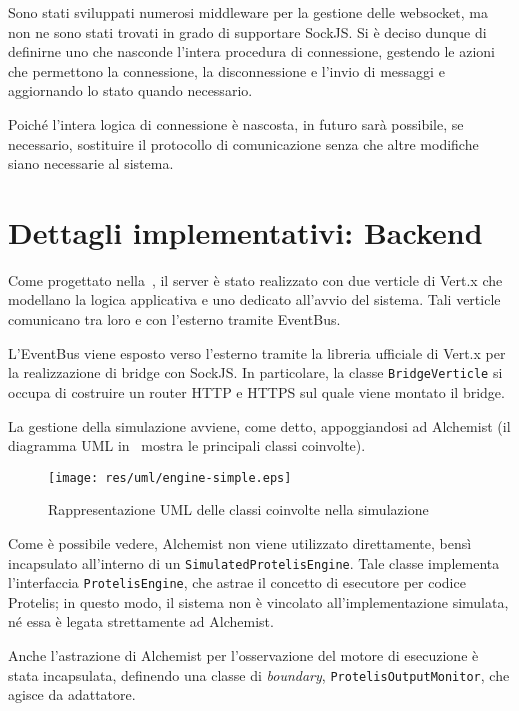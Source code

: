     Sono stati sviluppati numerosi middleware per la gestione delle websocket, ma non ne sono stati trovati in grado di supportare SockJS\@.
    Si è deciso dunque di definirne uno che nasconde l'intera procedura di connessione, gestendo le azioni che permettono la connessione, la disconnessione e l'invio di messaggi e aggiornando lo stato quando necessario.

    Poiché l'intera logica di connessione è nascosta, in futuro sarà possibile, se necessario, sostituire il protocollo di comunicazione senza che altre modifiche siano necessarie al sistema.


  \section{Dettagli implementativi: Backend}

    Come progettato nella~, il server è stato realizzato con due verticle di Vert.x che modellano la logica applicativa e uno dedicato all'avvio del sistema.
    Tali verticle comunicano tra loro e con l'esterno tramite EventBus.

    L'EventBus viene esposto verso l'esterno tramite la libreria ufficiale di Vert.x per la realizzazione di bridge con SockJS\@.
    In particolare, la classe \texttt{BridgeVerticle} si occupa di costruire un router HTTP e HTTPS sul quale viene montato il bridge.

    La gestione della simulazione avviene, come detto, appoggiandosi ad Alchemist (il diagramma UML in~ mostra le principali classi coinvolte).

    \begin{figure}[htbp]
      \centering
      \texttt{[image: res/uml/engine-simple.eps]}
      \caption{Rappresentazione UML delle classi coinvolte nella simulazione}%
      \label{fig:server:uml}
    \end{figure}

    Come è possibile vedere, Alchemist non viene utilizzato direttamente, bensì incapsulato all'interno di un \texttt{SimulatedProtelisEngine}.
    Tale classe implementa l'interfaccia \texttt{ProtelisEngine}, che astrae il concetto di esecutore per codice Protelis;
    in questo modo, il sistema non è vincolato all'implementazione simulata, né essa è legata strettamente ad Alchemist.

    Anche l'astrazione di Alchemist per l'osservazione del motore di esecuzione è stata incapsulata, definendo una classe di \emph{boundary}, \texttt{ProtelisOutputMonitor}, che agisce da adattatore.

